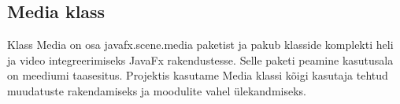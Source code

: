 \subsection{Media klass}
Klass Media on osa javafx.scene.media paketist ja pakub klasside komplekti heli ja video integreerimiseks JavaFx rakendustesse. Selle paketi peamine kasutusala on meediumi taasesitus. Projektis kasutame Media klassi kõigi kasutaja tehtud muudatuste rakendamiseks ja moodulite vahel ülekandmiseks.